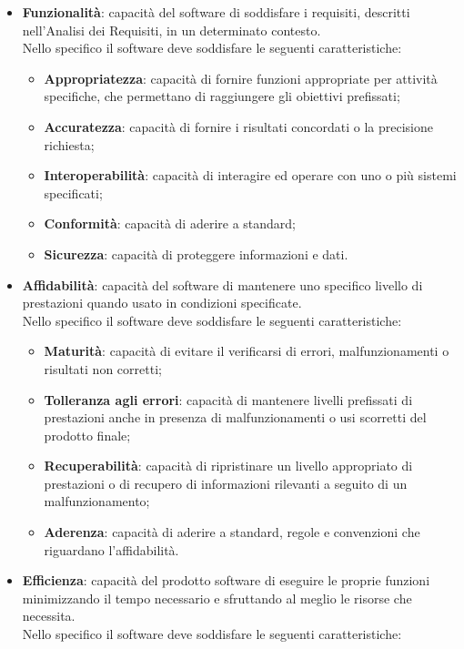 	\begin{itemize}
		\item \textbf{Funzionalità}: capacità del software di soddisfare i requisiti, descritti nell'Analisi dei Requisiti, in un determinato contesto.\\
		Nello specifico il software deve soddisfare le seguenti caratteristiche:
		\begin{itemize}
			\item \textbf{Appropriatezza}: capacità di fornire funzioni appropriate per attività specifiche, che permettano di raggiungere gli obiettivi prefissati;
			\item \textbf{Accuratezza}: capacità di fornire i risultati concordati o la precisione richiesta;
			\item \textbf{Interoperabilità}: capacità di interagire ed operare con uno o più sistemi specificati;
			\item \textbf{Conformità}: capacità di aderire a standard;
			\item \textbf{Sicurezza}: capacità di proteggere informazioni e dati.
		\end{itemize}
		\item \textbf{Affidabilità}: capacità del software di mantenere uno specifico livello di prestazioni quando usato in condizioni specificate.\\
		Nello specifico il software deve soddisfare le seguenti caratteristiche:
		\begin{itemize}
			\item \textbf{Maturità}: capacità di evitare il verificarsi di errori, malfunzionamenti o risultati non corretti;
			\item \textbf{Tolleranza agli errori}: capacità di mantenere livelli prefissati di prestazioni anche in presenza di malfunzionamenti o usi scorretti del prodotto finale;
			\item \textbf{Recuperabilità}: capacità di ripristinare un livello appropriato di prestazioni o di recupero di informazioni rilevanti a seguito di un malfunzionamento;
			\item \textbf{Aderenza}:  capacità di aderire a standard, regole e convenzioni che riguardano l'affidabilità.
		\end{itemize}
		\item \textbf{Efficienza}: capacità del prodotto software di eseguire le proprie funzioni minimizzando il tempo necessario e sfruttando al meglio le risorse che necessita.\\
		Nello specifico il software deve soddisfare le seguenti caratteristiche:

\end{itemize}
